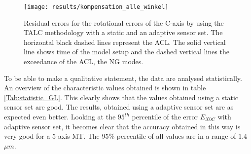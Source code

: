 \begin{figure}[!htb]
    \centering
    \texttt{[image: results/kompensation\_alle\_winkel]} %
    \caption[All angles deviations]{Residual errors for the rotational errors of the C-axis by using the TALC methodology with a static and an adaptive sensor set. The horizontal black dashed lines represent the ACL. The solid vertical line shows time of the model setup and the dashed vertical lines the exceedance of the ACL, the NG modes.}
    \label{fig:kompensation_winkel}
\end{figure}

To be able to make a qualitative statement, the data are analysed statistically. An overview of the characteristic values obtained is shown in table \ref{Tab:statistic_GL}. This clearly shows that the values obtained using a static sensor set are good. The results, obtained using a adaptive sensor set are as expected even better. Looking at the $95^{th}$ percentile of the error $E_{X0C}$ with adaptive sensor set, it becomes clear that the accuracy obtained in this way is very good for a 5-axis MT. The 95\% percentile of all values are in a range of 1.4 $\mu m$.



